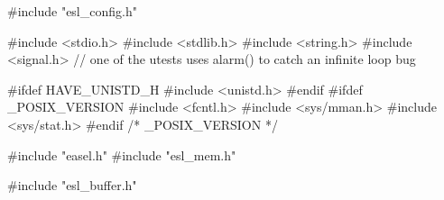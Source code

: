 \begin{cchunk}
#include "esl_config.h"

#include <stdio.h>
#include <stdlib.h>
#include <string.h>
#include <signal.h>   // one of the utests uses alarm() to catch an infinite loop bug

#ifdef HAVE_UNISTD_H
#include <unistd.h>
#endif
#ifdef _POSIX_VERSION
#include <fcntl.h>
#include <sys/mman.h>
#include <sys/stat.h>
#endif /* _POSIX_VERSION */

#include "easel.h"
#include "esl_mem.h"

#include "esl_buffer.h"
\end{cchunk}
